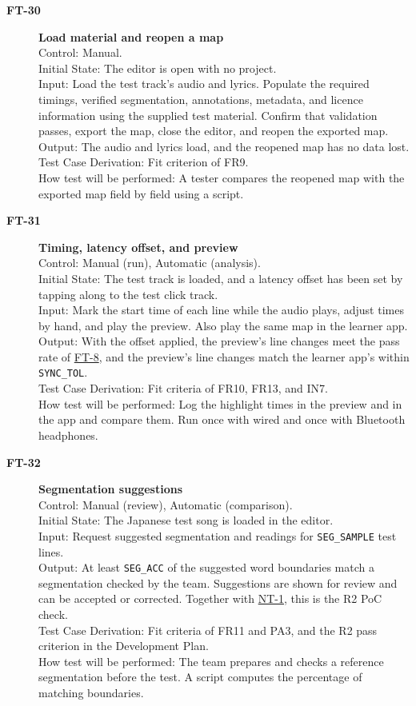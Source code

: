 \documentclass[12pt, titlepage]{article}
\newcommand{\tid}[1]{\hypertarget{test:#1}{\textbf{#1}}}
\newcommand{\tref}[1]{\hyperlink{test:#1}{#1}}
\newcommand{\cn}[1]{\texttt{#1}}
\begin{document}
\begin{description}

\item[\tid{FT-30}] \textbf{Load material and reopen a map}\\
Control: Manual.\\
Initial State: The editor is open with no project.\\
Input: Load the test track's audio and lyrics. Populate the required
timings, verified segmentation, annotations, metadata, and licence
information using the supplied test material. Confirm that validation
passes, export the map, close the editor, and reopen the exported map.\\
Output: The audio and lyrics load, and the reopened map has no data lost.\\
Test Case Derivation: Fit criterion of FR9.\\
How test will be performed: A tester compares the reopened map with the exported
map field by field using a script.

\item[\tid{FT-31}] \textbf{Timing, latency offset, and preview}\\
Control: Manual (run), Automatic (analysis).\\
Initial State: The test track is loaded, and a latency offset has been set by
tapping along to the test click track.\\
Input: Mark the start time of each line while the audio plays, adjust times by
hand, and play the preview. Also play the same map in the learner app.\\
Output: With the offset applied, the preview's line changes meet the pass rate of
\tref{FT-8}, and the preview's line changes match the learner app's within
\cn{SYNC\_TOL}.\\
Test Case Derivation: Fit criteria of FR10, FR13, and IN7.\\
How test will be performed: Log the highlight times in the preview and in the app
and compare them. Run once with wired and once with Bluetooth headphones.

\item[\tid{FT-32}] \textbf{Segmentation suggestions}\\
Control: Manual (review), Automatic (comparison).\\
Initial State: The Japanese test song is loaded in the editor.\\
Input: Request suggested segmentation and readings for \cn{SEG\_SAMPLE} test
lines.\\
Output: At least \cn{SEG\_ACC} of the suggested word boundaries match a
segmentation checked by the team. Suggestions are shown for review and can be
accepted or corrected. Together with \tref{NT-1}, this is the R2 PoC check.\\
Test Case Derivation: Fit criteria of FR11 and PA3, and the R2 pass criterion in
the Development Plan.\\
How test will be performed: The team prepares and checks a reference
segmentation before the test. A script computes the percentage of matching
boundaries.


\end{description}
\end{document}

